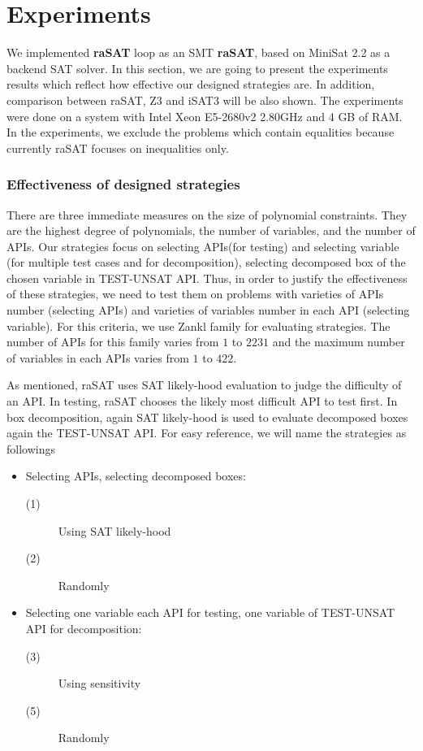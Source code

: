 \chapter{Experiments}

We implemented \textbf{raSAT} loop as an SMT {\bf raSAT}, 
based on MiniSat 2.2 as a backend SAT solver. In this section, we are going to present the experiments results which reflect how effective our designed strategies are. In addition, comparison between raSAT, Z3 and iSAT3 will be also shown. The experiments were done on a system with  Intel Xeon E5-2680v2 2.80GHz and 4 GB of RAM. In the experiments, we exclude the problems which contain equalities because currently raSAT focuses on inequalities only.

\subsection {Effectiveness of designed strategies} 
\label{sec:strategies}
There are three immediate measures on the size of polynomial constraints. They are the highest degree of polynomials, the number of variables, and the number of APIs. Our strategies focus on selecting APIs(for testing) and selecting variable (for multiple test cases and for decomposition), selecting decomposed box of the chosen variable in TEST-UNSAT API. Thus, in order to justify the effectiveness of these strategies, we need to test them on problems with varieties of APIs number (selecting APIs) and varieties of variables number in each API (selecting variable). For this criteria, we use Zankl family for evaluating strategies. The number of APIs for this family varies from $1$ to $2231$ and the maximum number of variables in each APIs varies from $1$ to $422$. 

As mentioned, raSAT uses SAT likely-hood evaluation to judge the difficulty of an API. In testing, raSAT chooses the likely most difficult API to test first. In box decomposition, again SAT likely-hood is used to evaluate decomposed boxes again the TEST-UNSAT API. For easy reference, we will name the strategies as followings

\begin{itemize}
  \item Selecting APIs, selecting decomposed boxes:
    \begin{description}
      \item[(1)] Using SAT likely-hood %
      \item[(2)] Randomly %
    \end{description}
  \item Selecting one variable each API for testing, one variable of TEST-UNSAT API for decomposition:
    \begin{description}
       \item[(3)] Using sensitivity %
       \item[(5)] Randomly %
    \end{description}
\end{itemize}

